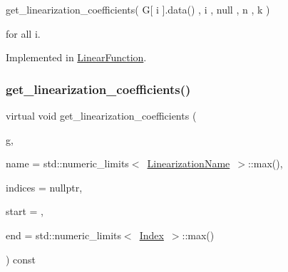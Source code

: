 get\+\_\+linearization\+\_\+coefficients( G\mbox{[} i \mbox{]}.data() , i , null , n , k )

for all i. 

Implemented in \mbox{\hyperlink{class_s_m_spp__di__unipi__it_1_1_linear_function_a724b5021bd38979148afc99a6a874125}{Linear\+Function}}.

\mbox{\label{class_s_m_spp__di__unipi__it_1_1_c05_function_a896415fd6afd72c28afaf6343c8f1805}} 
\subsubsection{\texorpdfstring{get\+\_\+linearization\+\_\+coefficients()}{get\_linearization\_coefficients()}\hspace{0.1cm}{\footnotesize\ttfamily [2/2]}}
{\footnotesize\ttfamily virtual void get\+\_\+linearization\+\_\+coefficients (\begin{DoxyParamCaption}\item[{\mbox{\hyperlink{class_s_m_spp__di__unipi__it_1_1_c05_function_a58afb1e1fdc931abd7129be4f92b1f61}{Sparse\+Vector}} \&}]{g,  }\item[{const \mbox{\hyperlink{class_s_m_spp__di__unipi__it_1_1_c05_function_ae90bf93c6d4b4ada66791c735d1c03cc}{Linearization\+Name}}}]{name = {\ttfamily std\+:\+:numeric\+\_\+limits$<$~\mbox{\hyperlink{class_s_m_spp__di__unipi__it_1_1_c05_function_ae90bf93c6d4b4ada66791c735d1c03cc}{Linearization\+Name}}~$>$\+:\+:max()},  }\item[{\mbox{\hyperlink{group___thin_var_dep_interface___c_l_a_s_s_e_s_ga03461123d4f6090aefeb97ef653d3f2b}{c\+\_\+\+Vec\+\_\+\+Index}} $\ast$const}]{indices = {\ttfamily nullptr},  }\item[{\mbox{\hyperlink{group___thin_var_dep_interface___c_l_a_s_s_e_s_gaee6156e2ce80720d57a082d80f39d8cc}{c\+\_\+\+Index}}}]{start = {},  }\item[{\mbox{\hyperlink{group___thin_var_dep_interface___c_l_a_s_s_e_s_gaee6156e2ce80720d57a082d80f39d8cc}{c\+\_\+\+Index}}}]{end = {\ttfamily std\+:\+:numeric\+\_\+limits$<$~\mbox{\hyperlink{group___thin_var_dep_interface___c_l_a_s_s_e_s_gad53d6229d7ec28555a9c9c2fd9abf773}{Index}}~$>$\+:\+:max()} }\end{DoxyParamCaption}) const\hspace{0.3cm}{\ttfamily [pure virtual]}}



